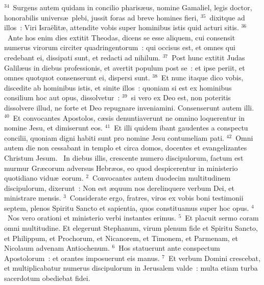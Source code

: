 ${}^{34}$~Surgens autem quidam in concilio pharis\ae us, nomine Gamaliel, legis doctor, honorabilis univers\ae\ plebi, jussit foras ad breve homines fieri,
${}^{35}$~dixitque ad illos~: Viri Isra\"elit\ae , attendite vobis super hominibus istis quid acturi sitis.
${}^{36}$~Ante hos enim dies extitit Theodas, dicens se esse aliquem, cui consensit numerus virorum circiter quadringentorum~: qui occisus est, et omnes qui credebant ei, dissipati sunt, et redacti ad nihilum.
${}^{37}$~Post hunc extitit Judas Galil\ae us in diebus professionis, et avertit populum post se~: et ipse periit, et omnes quotquot consenserunt ei, dispersi sunt.
${}^{38}$~Et nunc itaque dico vobis, discedite ab hominibus istis, et sinite illos~: quoniam si est ex hominibus consilium hoc aut opus, dissolvetur~:
${}^{39}$~si vero ex Deo est, non poteritis dissolvere illud, ne forte et Deo repugnare inveniamini. Consenserunt autem illi.
${}^{40}$~Et convocantes Apostolos, c\ae sis denuntiaverunt ne omnino loquerentur in nomine Jesu, et dimiserunt eos.
${}^{41}$~Et illi quidem ibant gaudentes a conspectu concilii, quoniam digni habiti sunt pro nomine Jesu contumeliam pati.
${}^{42}$~Omni autem die non cessabant in templo et circa domos, docentes et evangelizantes Christum Jesum.
~\lettrine[lines=10,image=true,loversize=0.05,lraise=-0.03]{I}{}n diebus illis, crescente numero discipulorum, factum est murmur Gr\ae corum adversus Hebr\ae os, eo quod despicerentur in ministerio quotidiano vidu\ae\ eorum.
${}^{2}$~Convocantes autem duodecim multitudinem discipulorum, dixerunt~: Non est \ae quum nos derelinquere verbum Dei, et ministrare mensis.
${}^{3}$~Considerate ergo, fratres, viros ex vobis boni testimonii septem, plenos Spiritu Sancto et sapientia, quos constituamus super hoc opus.
${}^{4}$~Nos vero orationi et ministerio verbi instantes erimus.
${}^{5}$~Et placuit sermo coram omni multitudine. Et elegerunt Stephanum, virum plenum fide et Spiritu Sancto, et Philippum, et Prochorum, et Nicanorem, et Timonem, et Parmenam, et Nicolaum advenam Antiochenum.
${}^{6}$~Hos statuerunt ante conspectum Apostolorum~: et orantes imposuerunt eis manus.
${}^{7}$~Et verbum Domini crescebat, et multiplicabatur numerus discipulorum in Jerusalem valde~: multa etiam turba sacerdotum obediebat fidei.


